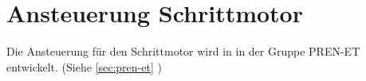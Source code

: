 \section{Ansteuerung Schrittmotor}
Die Ansteuerung für den Schrittmotor wird in in der Gruppe PREN-ET entwickelt. 
(Siehe \ref{sec:pren-et} )

